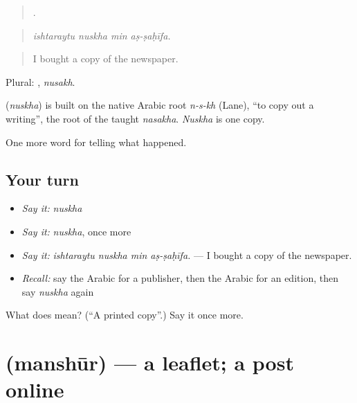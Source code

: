 \begin{quote}
   .
\end{quote}

\begin{quote}
\emph{ishtaraytu nuskha min aṣ-ṣaḥīfa.}
\end{quote}

\begin{quote}
I bought a copy of the newspaper.
\end{quote}

Plural: , \emph{nusakh}.

\begin{cousinweb}
\textbf{} (\emph{nuskha}) is built on the native Arabic root \emph{n-s-kh} (Lane), \textquotedblleft{}to copy out a writing\textquotedblright{}, the root of the taught \emph{nasakha}. \emph{Nuskha} is one copy.
\end{cousinweb}

\begin{grammarlens}[title={What you've built}]
One more word for telling what happened.
\end{grammarlens}

\subsection*{Your turn}
\begin{itemize}
\raggedright
  \item \emph{Say it:} \emph{nuskha}
  \item \emph{Say it:} \emph{nuskha}, once more
  \item \emph{Say it:} \emph{ishtaraytu nuskha min aṣ-ṣaḥīfa.} — I bought a copy of the newspaper.
  \item \emph{Recall:} say the Arabic for a publisher, then the Arabic for an edition, then say \emph{nuskha} again
\end{itemize}

\begin{tcolorbox}[breakable,colback=teal!4,colframe=teal!35!black,title={Before you move on}]
What does  mean? (\textquotedblleft{}A printed copy\textquotedblright{}.) Say it once more.
\end{tcolorbox}
\section[\texorpdfstring{\ar{منشور} (manshūr)}{منشور (manshūr)}]{ (manshūr) — a leaflet; a post online}

